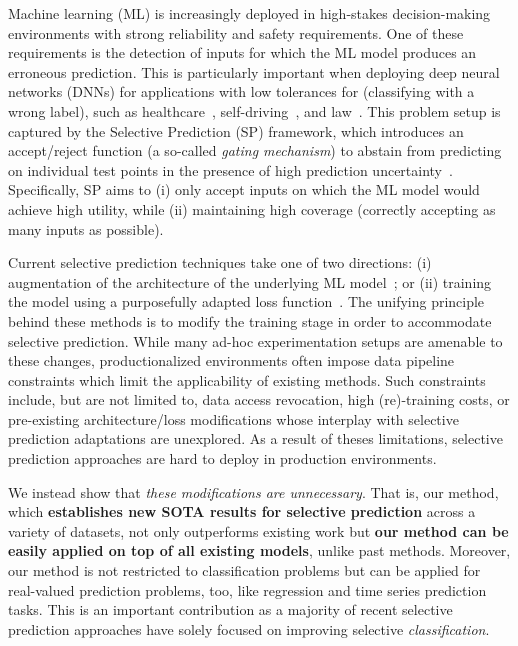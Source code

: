 Machine learning (ML) is increasingly deployed in high-stakes decision-making environments with strong reliability and safety requirements. One of these requirements is the detection of inputs for which the ML model produces an erroneous prediction. This is particularly important when deploying deep neural networks (DNNs) for applications with low tolerances for \fps (\ie classifying with a wrong label), such as healthcare~\citep{challen2019artificial, mozannar2020consistent}, self-driving~\citep{ghodsi2021generating}, and law~\citep{vieira2021understanding}.
This problem setup is captured by the Selective Prediction (SP) framework, which introduces an accept/reject function (a so-called \emph{gating mechanism}) to abstain from predicting on individual test points in the presence of high prediction uncertainty~\citep{geifman2017selective}. 
Specifically, SP aims to (i) only accept inputs on which the ML model would achieve high utility, while (ii) maintaining high coverage (\ie correctly accepting as many inputs as possible).

Current selective prediction techniques 
take one of two directions: (i) augmentation of the architecture of the underlying ML model~\citep{geifman2019selectivenet}; or (ii) training the model using a purposefully adapted loss function~\citep{liu2019deep, huang2020self, gangrade2021selective}. 
The unifying principle behind these methods is to modify the training stage in order to accommodate selective prediction. While many ad-hoc experimentation setups are amenable to these changes, productionalized environments often impose data pipeline constraints which limit the applicability of existing methods. Such constraints include, but are not limited to, data access revocation, high (re)-training costs, or pre-existing architecture/loss modifications whose interplay with selective prediction adaptations are unexplored. As a result of theses limitations, selective prediction approaches are hard to deploy in production environments.

We instead show that \textit{ these modifications are unnecessary}. That is, our method, which \textbf{establishes new SOTA results for selective prediction} across a variety of datasets, %
not only outperforms existing work but \textbf{our method can be easily applied on top of all existing models}, unlike past methods. Moreover, our method is not restricted to classification problems but can be applied for real-valued prediction problems, too, like regression and time series prediction tasks. This is an important contribution as a majority of recent selective prediction approaches have solely focused on improving selective \emph{classification}.

